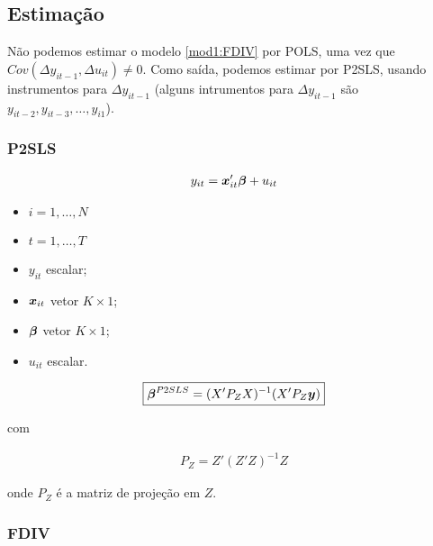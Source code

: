 \documentclass[11pt, oneside, a4paper, article]{article}
\numberwithin{equation}{section}
\begin{document}
\begin{description}
\subsection{Estimação}

Não podemos estimar o modelo \eqref{mod1:FDIV} por POLS, uma vez que $Cov(\Delta y_{it-1}, \Delta u_{it} ) \neq 0$.
Como saída, podemos estimar por P2SLS, usando instrumentos para $\Delta y_{it-1}$ (alguns intrumentos para $\Delta y_{it-1}$ são $y_{it-2}, y_{it-3}, \dots, y_{i1}$).

\subsubsection{P2SLS}

\vspace{-1 em}
\begin{align*}
	y_{it} = \boldsymbol{x}_{it}' \boldsymbol{\beta} + u_{it}
\end{align*}

\begin{itemize}\itemsep0pt
\item $i = 1, \dots, N$
\item $t = 1, \dots, T$
\item $y_{it}$ escalar;
\item $\boldsymbol{x}_{it}$  vetor $K \times 1$;
\item $\boldsymbol{\beta}$ vetor $K \times 1$;
\item $u_{it}$ escalar.
\end{itemize}

\vspace{-1 em}
\begin{align*}
\boxed{
\boldsymbol{\beta}^{P2SLS} =  ( X' P_{Z} X )^{-1} ( X' P_{Z} \boldsymbol{y} ) }
\end{align*}

\noindent
com

\vspace{-1 em}
\begin{align*}
\boxed{P_{Z} = Z'(Z'Z)^{-1}Z }
\end{align*}

\noindent
onde
$P_{Z}$ é a matriz de projeção em $Z$.

\subsubsection{FDIV}


\end{description}
\end{document}
